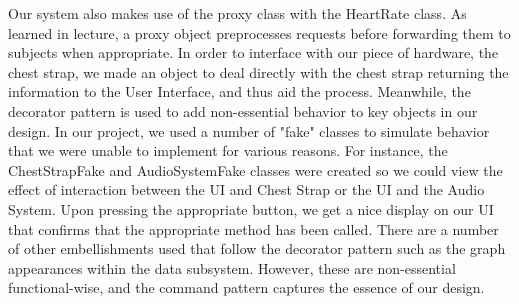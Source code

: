\documentclass[letterpaper,english, 12pt]{scrreprt}
\begin{document}
	Our system also makes use of the proxy class with the HeartRate class. As learned in lecture, a proxy object preprocesses requests before forwarding them to subjects when appropriate. In order to interface with our piece of hardware, the chest strap, we made an object to deal directly with the chest strap returning the information to the User Interface, and thus aid the process.  
Meanwhile, the decorator pattern is used to add non-essential behavior to key objects in our design. In our project, we used a number of "fake" classes to simulate behavior that we were unable to implement for various reasons. For instance, the ChestStrapFake and AudioSystemFake classes were created so we could view the effect of interaction between the UI and Chest Strap or the UI and the Audio System. Upon pressing the appropriate button, we get a nice display on our UI that confirms that the appropriate method has been called. There are a number of other embellishments used that follow the decorator pattern such as the graph appearances within the data subsystem. However, these are non-essential functional-wise, and the command pattern captures the essence of our design.
\end{document}
